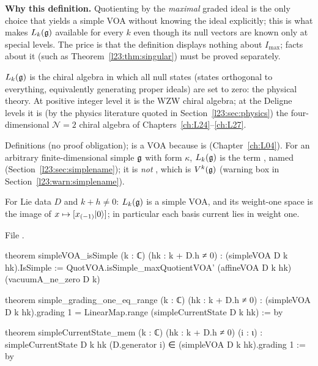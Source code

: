 \textbf{Why this definition.} Quotienting by the \emph{maximal} graded ideal is the only choice that yields a simple VOA
without knowing the ideal explicitly; this is what makes $L_k(\mathfrak g)$ available for every $k$ even though its null vectors are
known only at special levels. The price is that the definition displays nothing about $I_{\max}$; facts about it (such as
Theorem~\ref{l23:thm:singular}) must be proved separately.

\begin{physics}
$L_k(\mathfrak g)$ is the chiral algebra in which all null states (states orthogonal to everything, equivalently generating proper
ideals) are set to zero: the physical theory. At positive integer level it is the WZW chiral algebra; at the Deligne levels it is
(by the physics literature quoted in Section~\ref{l23:sec:physics}) the four-dimensional $\mathcal N=2$ chiral algebra of
Chapters~\ref{ch:L24}--\ref{ch:L27}.
\end{physics}

\begin{status}
Definitions (no proof obligation);  is a VOA because  is (Chapter~\ref{ch:L04}). For an
arbitrary finite-dimensional simple $\mathfrak g$ with form $\kappa$, $L_k(\mathfrak g)$ is the term
, named  (Section~\ref{l23:sec:simplename}); it is \emph{not} , which is $V^k(\mathfrak g)$ (warning box in
Section~\ref{l23:warn:simplename}).
\end{status}

\begin{theorem}\label{l23:thm:simple}
For Lie data $D$ and $k+h\ne0$: $L_k(\mathfrak g)$ is a simple VOA, and its weight-one space is the image of
$x\mapsto[x_{(-1)}|0\rangle]$; in particular each basis current lies in weight one.
\end{theorem}
\noindent File .
\begin{leancode}
theorem simpleVOA_isSimple (k : ℂ) (hk : k + D.h ≠ 0) : (simpleVOA D k hk).IsSimple :=
  QuotVOA.isSimple_maxQuotientVOA' (affineVOA D k hk) (vacuumA_ne_zero D k)

theorem simple_grading_one_eq_range (k : ℂ) (hk : k + D.h ≠ 0) :
    (simpleVOA D k hk).grading 1 = LinearMap.range (simpleCurrentState D k hk) := by

theorem simpleCurrentState_mem (k : ℂ) (hk : k + D.h ≠ 0) (i : ι) :
    simpleCurrentState D k hk (D.generator i) ∈ (simpleVOA D k hk).grading 1 := by
\end{leancode}

